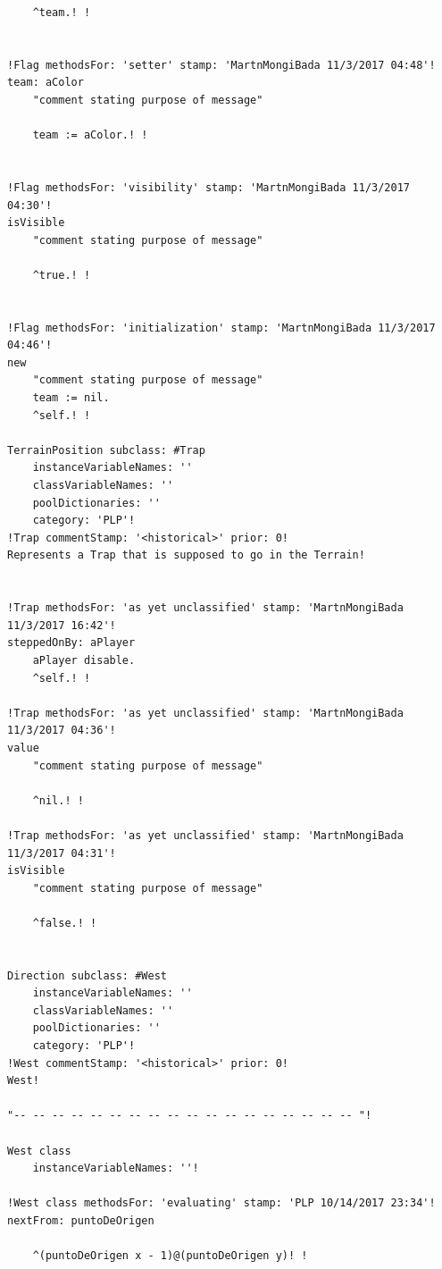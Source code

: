\documentclass[a4paper]{article}
\begin{document}
\begin{verbatim}
	^team.! !


!Flag methodsFor: 'setter' stamp: 'MartnMongiBada 11/3/2017 04:48'!
team: aColor
	"comment stating purpose of message"

	team := aColor.! !


!Flag methodsFor: 'visibility' stamp: 'MartnMongiBada 11/3/2017 04:30'!
isVisible
	"comment stating purpose of message"

	^true.! !


!Flag methodsFor: 'initialization' stamp: 'MartnMongiBada 11/3/2017 04:46'!
new
	"comment stating purpose of message"
	team := nil.
	^self.! !

TerrainPosition subclass: #Trap
	instanceVariableNames: ''
	classVariableNames: ''
	poolDictionaries: ''
	category: 'PLP'!
!Trap commentStamp: '<historical>' prior: 0!
Represents a Trap that is supposed to go in the Terrain!


!Trap methodsFor: 'as yet unclassified' stamp: 'MartnMongiBada 11/3/2017 16:42'!
steppedOnBy: aPlayer
	aPlayer disable.
	^self.! !

!Trap methodsFor: 'as yet unclassified' stamp: 'MartnMongiBada 11/3/2017 04:36'!
value
	"comment stating purpose of message"

	^nil.! !

!Trap methodsFor: 'as yet unclassified' stamp: 'MartnMongiBada 11/3/2017 04:31'!
isVisible
	"comment stating purpose of message"

	^false.! !


Direction subclass: #West
	instanceVariableNames: ''
	classVariableNames: ''
	poolDictionaries: ''
	category: 'PLP'!
!West commentStamp: '<historical>' prior: 0!
West!

"-- -- -- -- -- -- -- -- -- -- -- -- -- -- -- -- -- -- "!

West class
	instanceVariableNames: ''!

!West class methodsFor: 'evaluating' stamp: 'PLP 10/14/2017 23:34'!
nextFrom: puntoDeOrigen

	^(puntoDeOrigen x - 1)@(puntoDeOrigen y)! !

\end{verbatim}
\end{document}
